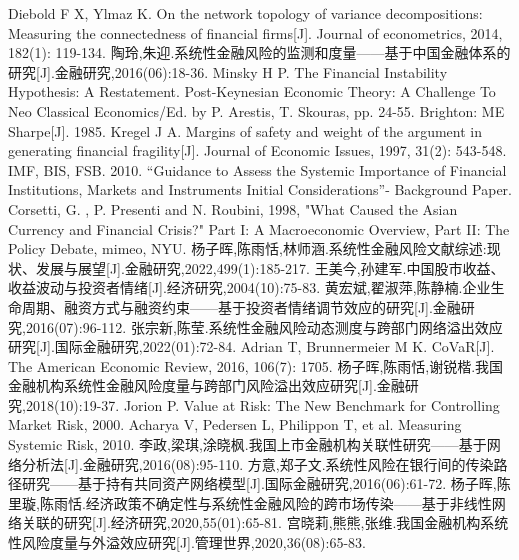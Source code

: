 \documentclass[lang=cn]{elegantpaper}
\begin{document}
\begin{thebibliography}{99}
    Diebold F X, Ylmaz K. On the network topology of variance decompositions: Measuring the connectedness of financial firms[J]. Journal of econometrics, 2014, 182(1): 119-134.
    陶玲,朱迎.系统性金融风险的监测和度量——基于中国金融体系的研究[J].金融研究,2016(06):18-36.
    Minsky H P. The Financial Instability Hypothesis: A Restatement. Post-Keynesian Economic Theory: A Challenge To Neo Classical Economics/Ed. by P. Arestis, T. Skouras, pp. 24-55. Brighton: ME Sharpe[J]. 1985.
    Kregel J A. Margins of safety and weight of the argument in generating financial fragility[J]. Journal of Economic Issues, 1997, 31(2): 543-548.
    IMF, BIS, FSB. 2010. “Guidance to Assess the Systemic Importance of Financial Institutions, Markets and Instruments
    Initial Considerations”- Background Paper.
    Corsetti, G. , P. Presenti and N. Roubini, 1998, "What Caused the Asian Currency and Financial Crisis?" Part I: A
    Macroeconomic Overview, Part II: The Policy Debate, mimeo, NYU.
    杨子晖,陈雨恬,林师涵.系统性金融风险文献综述:现状、发展与展望[J].金融研究,2022,499(1):185-217. 
    王美今,孙建军.中国股市收益、收益波动与投资者情绪[J].经济研究,2004(10):75-83.
    黄宏斌,翟淑萍,陈静楠.企业生命周期、融资方式与融资约束——基于投资者情绪调节效应的研究[J].金融研究,2016(07):96-112.
    张宗新,陈莹.系统性金融风险动态测度与跨部门网络溢出效应研究[J].国际金融研究,2022(01):72-84.
    Adrian T, Brunnermeier M K. CoVaR[J]. The American Economic Review, 2016, 106(7): 1705.
    杨子晖,陈雨恬,谢锐楷.我国金融机构系统性金融风险度量与跨部门风险溢出效应研究[J].金融研究,2018(10):19-37.
    Jorion P. Value at Risk: The New Benchmark for Controlling Market Risk, 2000.
    Acharya V, Pedersen L, Philippon T, et al. Measuring Systemic Risk, 2010.
    李政,梁琪,涂晓枫.我国上市金融机构关联性研究——基于网络分析法[J].金融研究,2016(08):95-110.
    方意,郑子文.系统性风险在银行间的传染路径研究——基于持有共同资产网络模型[J].国际金融研究,2016(06):61-72.
    杨子晖,陈里璇,陈雨恬.经济政策不确定性与系统性金融风险的跨市场传染——基于非线性网络关联的研究[J].经济研究,2020,55(01):65-81.
    宫晓莉,熊熊,张维.我国金融机构系统性风险度量与外溢效应研究[J].管理世界,2020,36(08):65-83.

\end{thebibliography}
\end{document}
